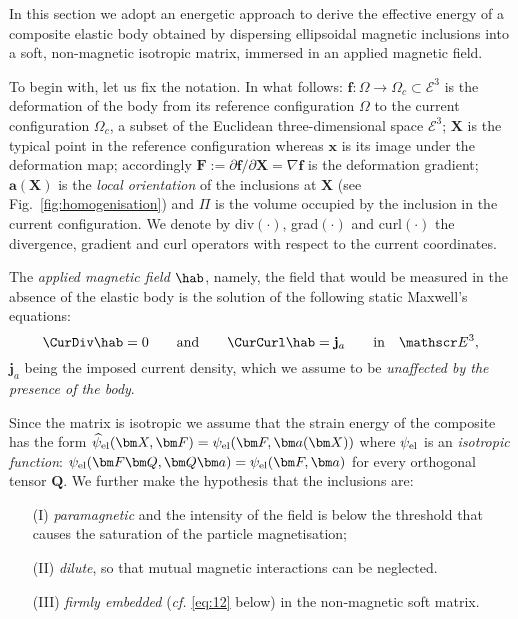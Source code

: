 \documentclass[oneside]{article}
\begin{document}
In this section we adopt an energetic approach to derive the effective energy  of a composite elastic body obtained by dispersing ellipsoidal magnetic inclusions into a soft, non-magnetic isotropic matrix, immersed in an applied magnetic field.

To begin with, let us fix the notation. In what follows: $\bm f:\Omega\to\Omega_c\subset{\mathscr E^3}$ is the deformation of the body from its reference configuration $\Omega$ to the current configuration $\Omega_c$, a subset of the Euclidean three-dimensional space $\mathscr E^3$; $\mathbf{X}$ is the typical point in the reference configuration whereas $\mathbf{x}$ is its image under the deformation map; accordingly $\mathbf{F}:=\partial \bm{f}/\partial \mathbf{X}=\nabla\bm f$ is the deformation gradient; $\boldsymbol a(\bm X)$ is the {\em local orientation} of the inclusions at $\bm X$ (see Fig.~\ref{fig:homogenisation}) and $\Pi$ is the volume occupied by the inclusion in the current configuration. We denote by div$(\cdot)$, grad$(\cdot)$ and curl$(\cdot)$ the divergence, gradient and curl operators with respect to the current coordinates.

The \emph{applied magnetic field} $\hab$, namely, the field that would be measured in the absence of the elastic body is the solution of the following static Maxwell's equations:
\begin{equation}
\CurDiv \hab = 0 \qquad \text{and} \qquad \CurCurl\hab = \mathbf{j}_a \qquad \text{in} \quad \mathscr E^3,
\label{Maxwellha}
\end{equation}
$\mathbf{j}_a$ being the imposed current density, which we assume to be \textit{unaffected by the presence of the body}.

Since the matrix is isotropic we assume that the strain energy of the composite  has the form $\widehat{\psi}_{\rm el}(\bm X,\bm F)=\psi_{\rm el}(\bm F,\bm a(\bm X))$ where $\psi_{\rm el}$ is an \emph{isotropic function}: $\psi_{\rm el}(\bm F\bm Q,\bm Q\bm a)=\psi_{\rm el}(\bm F,\bm a)$ for every orthogonal tensor $\bm Q$. We further make the hypothesis that the inclusions are:
\begin{enumerate}
	\item[(I)]  \emph{paramagnetic} and the intensity of the field is below the threshold that causes the saturation of the particle magnetisation;
	\item[(II)]  \emph{dilute}, so that mutual magnetic interactions can be neglected.
	\item[(III)]  \emph{firmly embedded } (\emph{cf.} \eqref{eq:12} below) in the non-magnetic soft matrix.
\end{enumerate}
\end{document}
